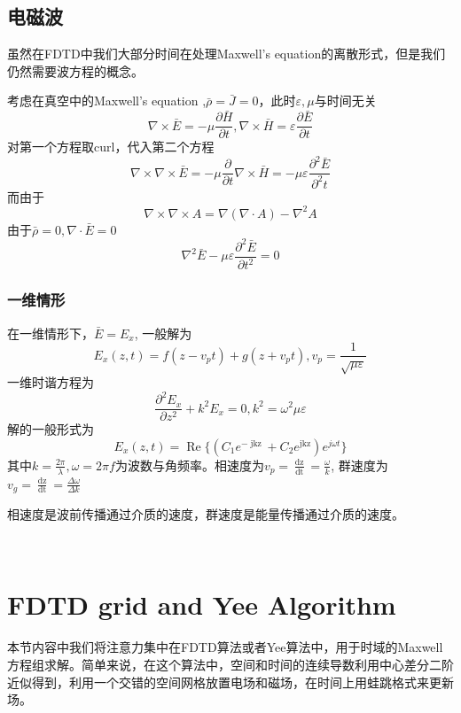 \documentclass{article}
\newcommand{\tmop}[1]{\ensuremath{\operatorname{#1}}}
\begin{document}
\begin{CJK*}{UTF8}{gbsn}
\begin{enumerate}
\end{enumerate}

\subsection{电磁波}

虽然在FDTD中我们大部分时间在处理Maxwell's
equation的离散形式，但是我们仍然需要波方程的概念。

考虑在真空中的Maxwell's equation ,$\bar{\rho} = \bar{J} =
0$，此时$\varepsilon, \mu$与时间无关
\[ \nabla \times \bar{E} = - \mu \frac{\partial \bar{H}}{\partial t}, \nabla
   \times \bar{H} = \varepsilon \frac{\partial \bar{E}}{\partial t} \]
对第一个方程取curl，代入第二个方程
\[ \nabla \times \nabla \times \bar{E} = - \mu \frac{\partial}{\partial t}
   \nabla \times \bar{H} = - \mu \varepsilon \frac{\partial^2
   \bar{E}}{\partial^2 t} \]
而由于
\[ \nabla \times \nabla \times A = \nabla (\nabla \cdot A) - \nabla^2 A \]
由于$\bar{\rho} = 0, \nabla \cdot \bar{E} = 0$
\[ \nabla^2 \bar{E} - \mu \varepsilon \frac{\partial^2 \bar{E}}{\partial t^2}
   = 0 \]

\subsubsection{一维情形}

在一维情形下，$\bar{E} = E_x$, 一般解为
\[ E_x (z, t) = f (z - v_p t) + g (z + v_p t), v_p = \frac{1}{\sqrt{\mu
   \varepsilon}} \]
一维时谐方程为
\[ \frac{\partial^2 E_x}{\partial z^2} + k^2 E_x = 0, k^2 = \omega^2 \mu
   \varepsilon \]
解的一般形式为
\[ E_x (z, t) = \tmop{Re} \{ (C_1 e^{- \tmop{jkz}} + C_2 e^{\tmop{jkz}}) e^{j
   \omega t} \} \]
其中$k = \frac{2 \pi}{\lambda}, \omega = 2 \pi
f$为波数与角频率。相速度为$v_p = \frac{\tmop{dz}}{\tmop{dt}} =
\frac{\omega}{k}$, 群速度为$v_g = \frac{\tmop{dz}}{\tmop{dt}} =
\frac{\Delta \omega}{\Delta k}$

相速度是波前传播通过介质的速度，群速度是能量传播通过介质的速度。

\

\section{FDTD grid and Yee Algorithm}

本节内容中我们将注意力集中在FDTD算法或者Yee算法中，用于时域的Maxwell方程组求解。简单来说，在这个算法中，空间和时间的连续导数利用中心差分二阶近似得到，利用一个交错的空间网格放置电场和磁场，在时间上用蛙跳格式来更新场。


\end{CJK*}
\end{document}
